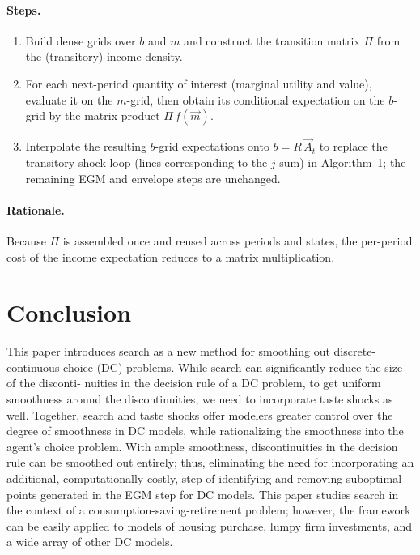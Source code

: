 \documentclass[11pt]{article}
\begin{document}
\paragraph{Steps.}
\begin{enumerate}
    \item Build dense grids over $b$ and $m$ and construct the transition matrix $\Pi$
    from the (transitory) income density. %
    \item For each next-period quantity of interest (marginal utility and value), evaluate
    it on the $m$-grid, then obtain its conditional expectation on the $b$-grid by the
    matrix product $\Pi \, f(\vec{m})$.
    \item Interpolate the resulting $b$-grid expectations onto $b = R\,\vec{A}_t$ to replace
    the transitory-shock loop (lines corresponding to the $j$-sum) in Algorithm~1; the
    remaining EGM and envelope steps are unchanged.
\end{enumerate}

\paragraph{Rationale.}
Because $\Pi$ is assembled once and reused across periods and states, the per-period cost of
the income expectation reduces to a matrix multiplication.

\section{Conclusion}
This paper introduces search as a new method for smoothing out discrete-continuous
choice (DC) problems. While search can significantly reduce the size of the disconti-
nuities in the decision rule of a DC problem, to get uniform smoothness around the
discontinuities, we need to incorporate taste shocks as well. Together, search and taste
shocks offer modelers greater control over the degree of smoothness in DC models, while
rationalizing the smoothness into the agent's choice problem. With ample smoothness,
discontinuities in the decision rule can be smoothed out entirely; thus, eliminating the
need for incorporating an additional, computationally costly, step of identifying and
removing suboptimal points generated in the EGM step for DC models. This paper
studies search in the context of a consumption-saving-retirement problem; however, the
framework can be easily applied to models of housing purchase, lumpy firm investments,
and a wide array of other DC models.
\end{document}
